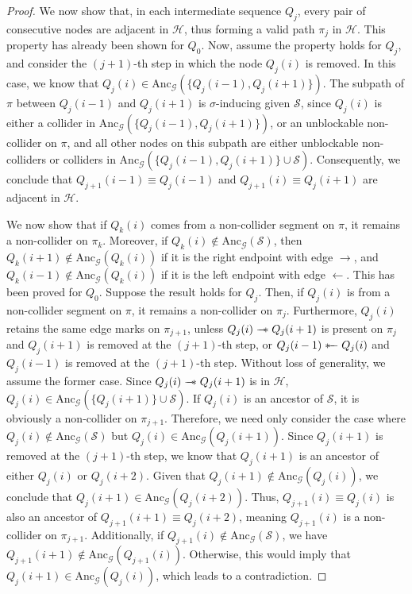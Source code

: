 \documentclass[accepted]{uai2025} %
\newcommand{\anc}{\text{Anc}}
\newcommand{\tuh}{\mathrel{\rightarrow}}
\newcommand{\hut}{\mathrel{\leftarrow}}
\newcommand{\sut}{\mathrel{{\ast\mkern-11mu\relbar\mkern-9mu\relbar}}}
\newcommand{\tus}{\mathrel{{\relbar\mkern-11mu\relbar\mkern-11mu\ast}}}
\begin{document}
\begin{proof}
We now show that, in each intermediate sequence \( Q_j \), every pair of consecutive nodes are adjacent in \( \mathcal{H} \), thus forming a valid path \( \pi_j \) in \( \mathcal{H} \). This property has already been shown for \( Q_0 \). Now, assume the property holds for \( Q_j \), and consider the \((j+1)\)-th step in which the node \( Q_j(i) \) is removed. In this case, we know that \( Q_j(i) \in \anc_\mathcal{G}(\{Q_j(i-1), Q_j(i+1)\}) \). The subpath of \( \pi \) between \( Q_j(i-1) \) and \( Q_j(i+1) \) is \(\sigma\)-inducing given \( \mathcal{S} \), since \( Q_j(i) \) is either a collider in \( \anc_\mathcal{G}(\{Q_j(i-1), Q_j(i+1)\}) \), or an unblockable non-collider on \( \pi \), and all other nodes on this subpath are either unblockable non-colliders or colliders in \( \anc_\mathcal{G}(\{Q_j(i-1), Q_j(i+1)\} \cup \mathcal{S}) \). Consequently, we conclude that \( Q_{j+1}(i-1) \equiv Q_j(i-1) \) and \( Q_{j+1}(i) \equiv Q_j(i+1) \) are adjacent in \( \mathcal{H} \).

We now show that if \( Q_k(i) \) comes from a non-collider segment on \( \pi \), it remains a non-collider on \( \pi_k \). Moreover, if \( Q_k(i) \notin \anc_\mathcal{G}(\mathcal{S}) \), then \( Q_k(i+1) \notin \anc_\mathcal{G}(Q_k(i)) \) if it is the right endpoint with edge \( \tuh \), and \( Q_k(i-1) \notin \anc_\mathcal{G}(Q_k(i)) \) if it is the left endpoint with edge \( \hut \). This has been proved for \( Q_0 \). Suppose the result holds for \( Q_j \). Then, if \( Q_j(i) \) is from a non-collider segment on \( \pi \), it remains a non-collider on \( \pi_j \). Furthermore, \( Q_j(i) \) retains the same edge marks on \( \pi_{j+1} \), unless \( Q_j(i)\tus Q_j(i+1) \) is present on \( \pi_j \) and \( Q_j(i+1) \) is removed at the \( (j+1) \)-th step, or \( Q_j(i-1)\sut Q_j(i) \) and \( Q_j(i-1) \) is removed at the \( (j+1) \)-th step. Without loss of generality, we assume the former case. Since \( Q_j(i)\tus Q_j(i+1) \) is in \( \mathcal{H} \), $Q_j(i)\in\anc_\mathcal{G}(\{Q_j(i+1)\}\cup\mathcal{S})$. If \( Q_j(i) \) is an ancestor of \( \mathcal{S} \), it is obviously a non-collider on \( \pi_{j+1} \). Therefore, we need only consider the case where \( Q_j(i) \notin \anc_\mathcal{G}(\mathcal{S}) \) but \( Q_j(i) \in \anc_\mathcal{G}(Q_j(i+1)) \). Since \( Q_j(i+1) \) is removed at the \( (j+1) \)-th step, we know that \( Q_j(i+1) \) is an ancestor of either \( Q_j(i) \) or \( Q_j(i+2) \). Given that \( Q_j(i+1) \notin \anc_\mathcal{G}( Q_j(i) ) \), we conclude that \( Q_j(i+1) \in \anc_\mathcal{G}( Q_j(i+2) ) \). Thus, \( Q_{j+1}(i) \equiv Q_j(i) \) is also an ancestor of \( Q_{j+1}(i+1) \equiv Q_{j}(i+2) \), meaning \( Q_{j+1}(i) \) is a non-collider on \( \pi_{j+1} \). Additionally, if \( Q_{j+1}(i) \notin \anc_\mathcal{G}(\mathcal{S}) \), we have \( Q_{j+1}(i+1) \notin \anc_\mathcal{G}( Q_{j+1}(i) ) \). Otherwise, this would imply that \( Q_j(i+1) \in \anc_\mathcal{G}( Q_j(i) ) \), which leads to a contradiction.


\end{proof}
\end{document}
